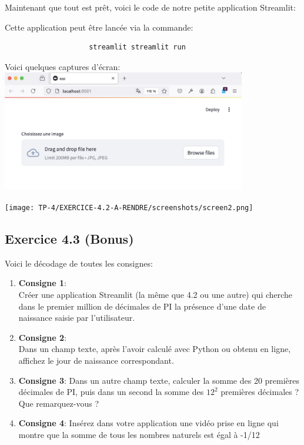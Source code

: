 \documentclass[a4paper,11pt]{article}
\begin{document}
            \noindent Maintenant que tout est prêt, voici le code de notre petite application Streamlit:

            

            \noindent Cette application peut être lancée via la commande:
            \begin{tcolorbox}[colback=lightgray!6, colframe=black, left=-40mm, right=5mm, top=2mm, bottom=-2mm, boxrule=0.1mm]
                \begin{verbatim}
                    streamlit streamlit run
                \end{verbatim}
            \end{tcolorbox}

            \noindent Voici quelques captures d'écran:\\
            \includegraphics[width=0.8\textwidth]{TP-4/EXERCICE-4.2-A-RENDRE/screenshots/screen1.png}
            
            \newpage
            \texttt{[image: TP-4/EXERCICE-4.2-A-RENDRE/screenshots/screen2.png]}
            
        \newpage
        \subsection{Exercice 4.3 (Bonus)}
            \noindent Voici le décodage de toutes les consignes:
            \begin{enumerate}
                \item \textbf{Consigne 1}: \\
                    Créer une application Streamlit (la même que 4.2 ou une autre) qui cherche 
                    dans le premier million de décimales de PI la présence d'une date de naissance saisie par l'utilisateur.
                \item \textbf{Consigne 2}:\\
                    Dans un champ texte, après l'avoir calculé avec Python ou obtenu en ligne, affichez le jour de naissance correspondant.
                \item \textbf{Consigne 3}:
                    Dans un autre champ texte, calculer la somme des 20 premières décimales de PI, puis 
                    dans un second la somme des $12^2$ premières décimales ? Que remarquez-vous ?
                \item \textbf{Consigne 4}:
                    Insérez dans votre application une vidéo prise en ligne qui montre que la somme de tous les nombres naturels est égal à -1/12
            \end{enumerate}
\end{document}

